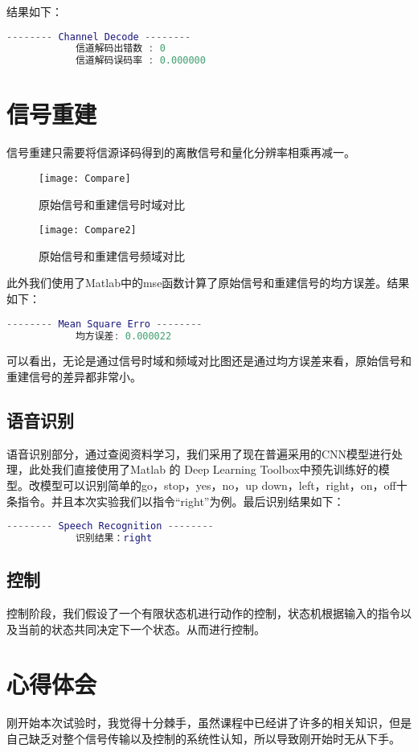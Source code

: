\documentclass{../source/Experiment}
\begin{document}
结果如下：
\begin{lstlisting}[language = matlab]
            -------- Channel Decode --------
            信道解码出错数 : 0
            信道解码误码率 : 0.000000
            \end{lstlisting}

\section{信号重建}
信号重建只需要将信源译码得到的离散信号和量化分辨率相乘再减一。
\begin{figure}[H]
    \centering
    \texttt{[image: Compare]}
    \caption{原始信号和重建信号时域对比}
\end{figure}

\begin{figure}
    \centering
    \texttt{[image: Compare2]}
    \caption{原始信号和重建信号频域对比}
\end{figure}

此外我们使用了Matlab中的mse函数计算了原始信号和重建信号的均方误差。结果如下：
\begin{lstlisting}[language = matlab]
            -------- Mean Square Erro --------
            均方误差: 0.000022
            \end{lstlisting}

可以看出，无论是通过信号时域和频域对比图还是通过均方误差来看，原始信号和重建信号的差异都非常小。
\subsection{语音识别}
语音识别部分，通过查阅资料学习，我们采用了现在普遍采用的CNN模型进行处理，此处我们直接使用了Matlab 的 Deep Learning Toolbox中预先训练好的模型。改模型可以识别简单的go，stop，yes，no，up down，left，right，on，off十条指令。并且本次实验我们以指令“right”为例。最后识别结果如下：
\begin{lstlisting}[language = matlab]
            -------- Speech Recognition --------
            识别结果：right
            \end{lstlisting}

\subsection{控制}
控制阶段，我们假设了一个有限状态机进行动作的控制，状态机根据输入的指令以及当前的状态共同决定下一个状态。从而进行控制。

\section{心得体会}
刚开始本次试验时，我觉得十分棘手，虽然课程中已经讲了许多的相关知识，但是自己缺乏对整个信号传输以及控制的系统性认知，所以导致刚开始时无从下手。
\end{document}
